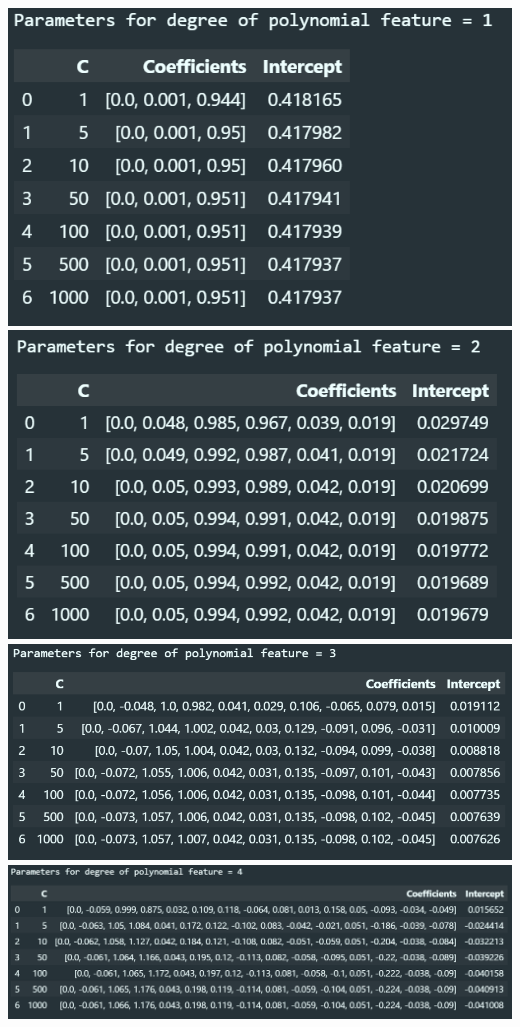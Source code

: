 \documentclass[10pt]{article}
\begin{document}
\begin{center}
  \includegraphics[scale=0.4]{./images/Table_6.png}
  \includegraphics[scale=0.4]{./images/Table_7.png}
  \vspace{5mm}
  \includegraphics[scale=0.4]{./images/Table_8.png}
  \vspace{5mm}
  \includegraphics[scale=0.4]{./images/Table_9.png}

\end{center}
\end{document}
